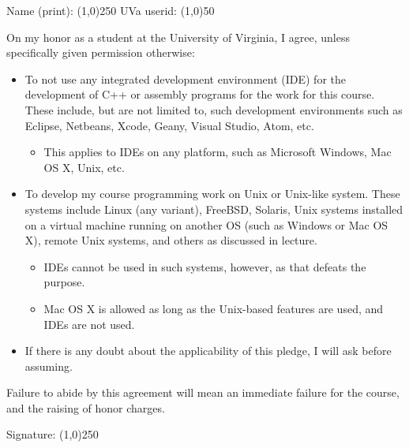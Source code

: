 \documentclass{article}
\begin{document}
\Large

\noindent Name (print): \line(1,0){250} \hspace{0.25in} UVa userid:
\line(1,0){50}

\vspace{0.5in}


\vspace{0.5in}

\noindent On my honor as a student at the University of Virginia, I
agree, unless specifically given permission otherwise:

\begin{itemize}

\item To not use any integrated development environment (IDE) for the
  development of C++ or assembly programs for the work for this
  course. These include, but are not limited to, such development
  environments such as Eclipse, Netbeans, Xcode, Geany, Visual Studio,
  Atom, etc.

\begin{itemize}

\item This applies to IDEs on any platform, such as Microsoft Windows,
  Mac OS X, Unix, etc.

\end{itemize}

\item To develop my course programming work on Unix or Unix-like
  system. These systems include Linux (any variant), FreeBSD, Solaris,
  Unix systems installed on a virtual machine running on another OS
  (such as Windows or Mac OS X), remote Unix systems, and others as
  discussed in lecture.

\begin{itemize}

\item IDEs cannot be used in such systems, however, as that defeats
  the purpose.

\item Mac OS X is allowed as long as the Unix-based features are used,
  and IDEs are not used.

\end{itemize}

\item If there is any doubt about the applicability of this pledge, I
  will ask before assuming.

\end{itemize}

\vspace{0.25in}

\noindent Failure to abide by this agreement will mean an immediate
failure for the course, and the raising of honor charges.

\vspace{0.5in}

\noindent Signature: \line(1,0){250}
\end{document}
